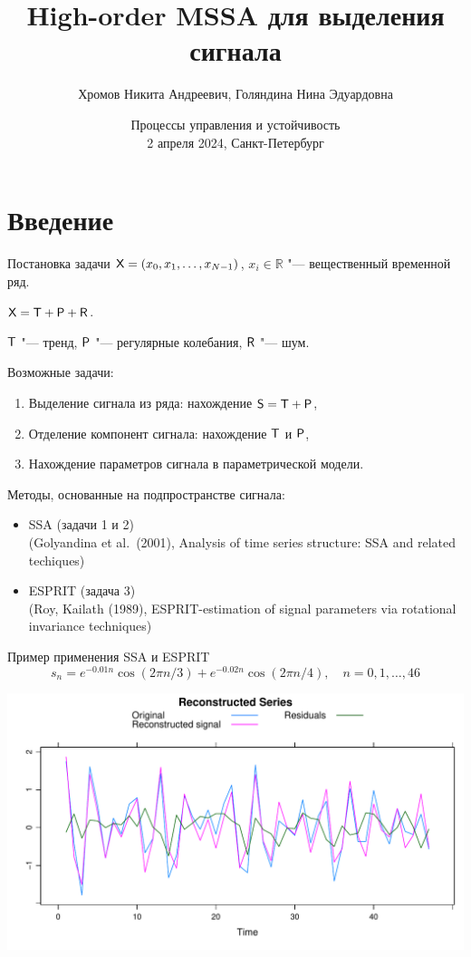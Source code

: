 \documentclass[ucs, notheorems, handout]{beamer}
\title[HO-MSSA]{High-order MSSA для выделения сигнала}
\author[Хромов Н.А., Голяндина Н.Э.]{Хромов Никита Андреевич, Голяндина Нина Эдуардовна}
\institute[Санкт-Петербургский Государственный Университет]{%
    \small
    Санкт-Петербургский государственный университет\\
    Кафедра статистического моделирования\\
    \vspace{1.6cm}
}
\date{Процессы управления и устойчивость\\
2 апреля 2024, Санкт-Петербург}
\newcommand{\bluetext}[1]{{\usebeamercolor[fg]{bluetext_color}#1}}
\begin{document}
    \begin{frame}[plain]
        \titlepage

    \end{frame}


    \section{Введение}\label{sec:introduction}
    \begin{frame}{Постановка задачи}
        $\mathsf{X}=(x_0, x_1,\ldots, x_{N-1})$, $x_i\in \mathbb{R}$ "--- вещественный временной ряд.

        $\mathsf{X} = \mathsf{T} + \mathsf{P} + \mathsf{R}$.

        $\mathsf{T}$ "--- тренд, $\mathsf{P}$ "--- регулярные колебания, $\mathsf{R}$ "--- шум.
        \vspace{0.3cm}

        \bluetext{Возможные задачи:}
        \begin{enumerate}
            \item Выделение сигнала из ряда: нахождение $\mathsf{S} = \mathsf{T} + \mathsf{P}$,
            \item Отделение компонент сигнала: нахождение $\mathsf{T}$ и $\mathsf{P}$,
            \item Нахождение параметров сигнала в параметрической модели.
        \end{enumerate}

        \vspace{0.3cm}
        Методы, основанные на подпространстве сигнала:
        \begin{itemize}
            \item SSA (задачи 1 и 2)
            \\(Golyandina et al.\ (2001), Analysis of time series structure: SSA and related techiques)
            \item ESPRIT (задача 3)
            \\(Roy, Kailath (1989), ESPRIT-estimation of signal parameters via rotational invariance techniques)
        \end{itemize}
    \end{frame}

    \begin{frame}{Пример применения SSA и ESPRIT}
        \[
            s_n = e^{-0.01 n} \cos(2\pi n / 3) + e^{-0.02 n} \cos(2\pi n / 4), \quad n=0, 1, \ldots, 46
        \]

        \smallskip
        \center
        \includegraphics[width=\textwidth]{img/decomp}
    \end{frame}
\end{document}

